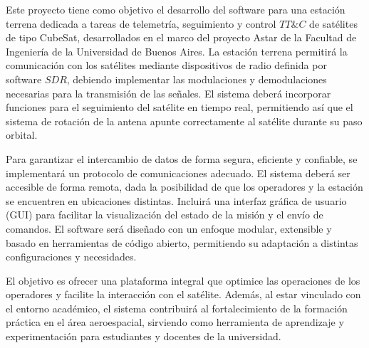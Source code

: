 
Este proyecto tiene como objetivo el desarrollo del software para una estación terrena dedicada a tareas de telemetría, seguimiento y control \( TT\&C \) de satélites de tipo CubeSat, desarrollados en el marco del proyecto Astar de la Facultad de Ingeniería de la Universidad de Buenos Aires. La estación terrena permitirá la comunicación con los satélites mediante dispositivos de radio definida por software \( SDR \), debiendo implementar las modulaciones y demodulaciones necesarias para la transmisión de las señales. El sistema deberá incorporar funciones para el seguimiento del satélite en tiempo real, permitiendo así que el sistema de rotación de la antena apunte correctamente al satélite durante su paso orbital.

Para garantizar el intercambio de datos de forma segura, eficiente y confiable, se implementará un protocolo de comunicaciones adecuado. El sistema deberá ser accesible de forma remota, dada la posibilidad de que los operadores y la estación se encuentren en ubicaciones distintas. Incluirá una interfaz gráfica de usuario (GUI) para facilitar la visualización del estado de la misión y el envío de comandos. El software será diseñado con un enfoque modular, extensible y basado en herramientas de código abierto, permitiendo su adaptación a distintas configuraciones y necesidades.

El objetivo es ofrecer una plataforma integral que optimice las operaciones de los operadores y facilite la interacción con el satélite. Además, al estar vinculado con el entorno académico, el sistema contribuirá al fortalecimiento de la formación práctica en el área aeroespacial, sirviendo como herramienta de aprendizaje y experimentación para estudiantes y docentes de la universidad.
